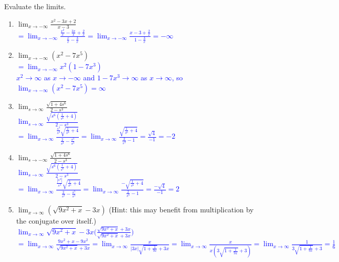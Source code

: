 \documentclass{ximera}
\begin{document}
\begin{exercise}
    Evaluate the limits.\\
  \begin{enumerate}
    \item $\displaystyle\lim_{x\rightarrow -\infty}\frac{x^2-3x+2}{x-3}$\\
    \textcolor{blue}{$=\displaystyle \lim_{x\rightarrow -\infty} \frac{\frac{x^2}{x}-\frac{3x}{x}+\frac{2}{x}}{\frac{x}{x}-\frac{3}{x}}=\lim_{x\rightarrow -\infty} \frac{x-3+\frac{2}{x}}{1-\frac{3}{x}}=-\infty$}\\
    
    
    \item $\displaystyle\lim_{x\rightarrow -\infty} (x^2-7x^5)$\\
    \textcolor{blue}{$=\displaystyle \lim_{x\rightarrow -\infty} x^2(1-7x^3)$\\
    $x^2\rightarrow \infty$ as $x\rightarrow -\infty$ and $1-7x^3\rightarrow \infty$ as $x\rightarrow \infty$, so $\displaystyle\lim_{x\rightarrow -\infty} (x^2-7x^5)=\infty$}
    
    \item $\displaystyle\lim_{s\rightarrow \infty}\frac{\sqrt{1+4s^6}}{2-s^3}$\\
    \textcolor{blue}{$\displaystyle\lim_{s\rightarrow \infty}\frac{\sqrt{s^6(\frac{1}{s^6}+4)}}{2-s^3}$\\
    $=\displaystyle \lim_{x\rightarrow \infty}\frac{\frac{s^3}{s^3}\sqrt{\frac{1}{s^6}+4}}{\frac{2}{s^3}-\frac{s^3}{s^3}}=\lim_{x\rightarrow \infty}\frac{\sqrt{\frac{1}{s^6}+4}}{\frac{2}{s^3}-1}=\frac{\sqrt{4}}{-1}=-2$}
    
    \item $\displaystyle\lim_{s\rightarrow -\infty}\frac{\sqrt{1+4s^6}}{2-s^3}$\\
    \textcolor{blue}{$\displaystyle\lim_{s\rightarrow \infty}\frac{\sqrt{s^6(\frac{1}{s^6}+4)}}{2-s^3}$\\
    $=\displaystyle \lim_{x\rightarrow \infty}\frac{\frac{|s^3|}{s^3}\sqrt{\frac{1}{s^6}+4}}{\frac{2}{s^3}-\frac{s^3}{s^3}}=\lim_{x\rightarrow \infty}\frac{-\sqrt{\frac{1}{s^6}+4}}{\frac{2}{s^3}-1}=\frac{-\sqrt{4}}{-1}=2$}
    
    \item $\displaystyle\lim_{x\rightarrow \infty}(\sqrt{9x^2+x}-3x)$ (Hint: this may benefit from multiplication by the conjugate over itself.)\\
    \textcolor{blue}{$\displaystyle \lim_{x\rightarrow \infty}\sqrt{9x^2+x}-3x\bigg(\frac{\sqrt{9x^2+x}+3x}{\sqrt{9x^2+x}+3x}\bigg)$\\
    $=\displaystyle \lim_{x\rightarrow \infty} \frac{9x^2+x-9x^2}{\sqrt{9x^2+x}+3x}=\lim_{x\rightarrow \infty}\frac{x}{|3x| \sqrt{1+\frac{1}{9x}}+3x}=\lim_{x\rightarrow \infty}\frac{x}{x(3\sqrt{1+\frac{1}{9x}}+3)}=\lim_{x\rightarrow \infty}\frac{1}{3\sqrt{1+\frac{1}{9x}}+3}=\frac{1}{6}$}
    

\end{enumerate}
\end{exercise}
\end{document}
